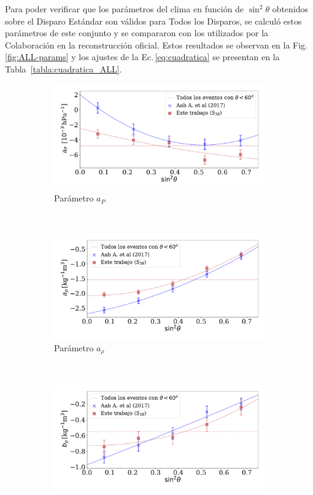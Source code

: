 Para poder verificar que los parámetros del clima en función de $\sin^2\theta$ obtenidos sobre el Disparo Estándar son válidos para Todos los Disparos, se calculó estos parámetros de este conjunto y se compararon con los utilizados por la Colaboración en la reconstrucción oficial. Estos resultados se observan en la Fig.\,\ref{fig:ALL-params} y los ajustes de la Ec.\,\ref{eq:cuadratica} se presentan en la Tabla~\ref{tabla:cuadratica_ALL}.   

\begin{figure}[H]
  \centering
  \begin{subfigure}[b]{0.8\textwidth}
  \includegraphics[width=\linewidth]{Graphs/params/ap_AllTriggers.pdf}
  \caption{Parámetro $a_P$ }
  \end{subfigure}\\
  \begin{subfigure}[b]{0.8\textwidth}
  \includegraphics[width=\linewidth]{Graphs/params/arho_AllTriggers.pdf}
  \caption{Parámetro $a_{\rho}$ }
  \end{subfigure}\\
  \begin{subfigure}[b]{\textwidth}
  \centering
  \includegraphics[width=0.8\linewidth]{Graphs/params/brho_AllTriggers.pdf}

\end{subfigure}
\end{figure}
